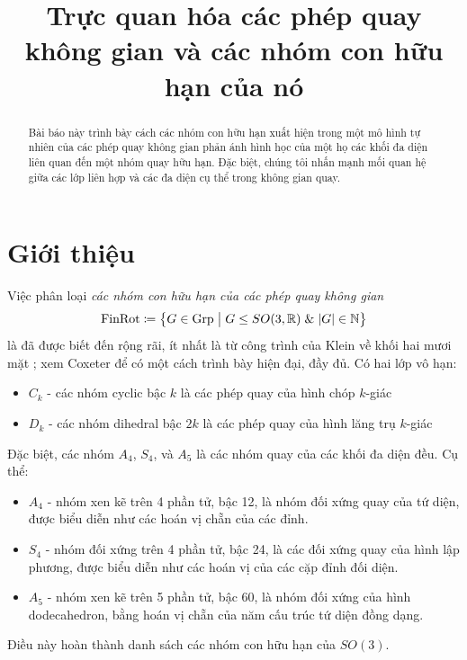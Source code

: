 \documentclass{article}
\theoremstyle{plain}
\theoremstyle{definition}
\begin{document}
\title{Trực quan hóa các phép quay không gian và các nhóm con hữu hạn của nó}
\author{}

\maketitle

\begin{abstract}
Bài báo này trình bày cách các nhóm con hữu hạn xuất hiện trong một mô hình tự nhiên của các phép quay không gian phản ánh hình học của một họ các khối đa diện liên quan đến một nhóm quay hữu hạn. Đặc biệt, chúng tôi nhấn mạnh mối quan hệ giữa các lớp liên hợp và các đa diện cụ thể trong không gian quay. 
\end{abstract}


\section{Giới thiệu}
    
    Việc phân loại \emph{các nhóm con hữu hạn của các phép quay không gian}
    \begin{equation}
        \mathrm{FinRot}\coloneqq\left\{G\in \mathrm{Grp}\hspace{1mm}\big|\hspace{1mm} G\leq SO(3,\mathbb{R})\hspace{1mm}\mathrm{\&}\hspace{1mm} |G|\in \mathbb{N}\right\}
    \end{equation}
    là đã được biết đến rộng rãi, ít nhất là từ công trình của Klein về khối hai mươi mặt \cite{klein}; xem Coxeter \cite[tr.~53]{coxeter1973} để có một cách trình bày hiện đại, đầy đủ. Có hai lớp vô hạn: 
    \begin{itemize}
        \item $C_k$ - các nhóm cyclic bậc $k$ là các phép quay của hình chóp $k$-giác
        \item $D_{k}$ - các nhóm dihedral bậc $2k$ là các phép quay của hình lăng trụ $k$-giác
    \end{itemize}
    Đặc biệt, các nhóm $A_4$, $S_4$, và $A_5$ là các nhóm quay của các khối đa diện đều.  Cụ thể: 
    \begin{itemize}
        \item $A_4$ - nhóm xen kẽ trên 4 phần tử, bậc 12, là nhóm đối xứng quay của tứ diện, được biểu diễn như các hoán vị chẵn của các đỉnh. 
        \item $S_4$ - nhóm đối xứng trên 4 phần tử, bậc 24, là các đối xứng quay của hình lập phương, được biểu diễn như các hoán vị của các cặp đỉnh đối diện.
        \item $A_5$ - nhóm xen kẽ trên 5 phần tử, bậc 60, là nhóm đối xứng của hình dodecahedron, bằng hoán vị chẵn của năm cấu trúc tứ diện đồng dạng.
    \end{itemize}  Điều này hoàn thành danh sách các nhóm con hữu hạn của $SO(3)$.
    
\end{document}
